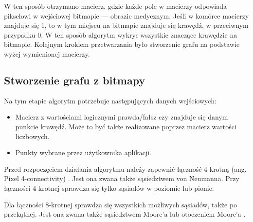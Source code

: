 \documentclass[a4paper,11pt,twoside]{report}
\theoremstyle{definition}
\begin{document}
W ten sposób otrzymano macierz, gdzie każde pole w macierzy odpowiada pikselowi w wejściowej bitmapie --- obrazie medycznym. Jeśli w komórce macierzy znajduje się 1, to w tym miejscu na bitmapie znajduje się krawędź, w przeciwnym przypadku 0. W ten sposób algorytm wykrył wszystkie znaczące krawędzie na bitmapie. Kolejnym krokiem przetwarzania było stworzenie grafu na podstawie wyżej wymienionej macierzy.

\cite{Algorytmy Sedgewick}
\cite{C w pigulce}


\subsection {Stworzenie grafu z bitmapy}

Na tym etapie algorytm potrzebuje następujących danych wejściowych:
\begin{itemize}[noitemsep]
\item Macierz z wartościami logicznymi prawda/fałsz czy znajduje się danym punkcie krawędź. Może to być także realizowane poprzez macierz wartości liczbowych.
\item Punkty wybrane przez użytkownika aplikacji.
\end{itemize}

Przed rozpoczęciem działania algorytmu należy zapewnić łączność 4-krotną (ang. Pixel 4-connectivity) \cite{Pixel connectivity}. Jest ona zwana także sąsiedztwem von Neumanna. Przy łączności 4-krotnej sprawdza się tylko sąsiadów w poziomie lub pionie.

\begin{center}
\end{center}

Dla łączności 8-krotnej sprawdza się wszystkich możliwych sąsiadów, także po przekątnej. Jest ona zwana także sąsiedztwem Moore'a lub otoczeniem Moore'a \cite{Moore}.

\begin{center}
\end{center}
\end{document}
